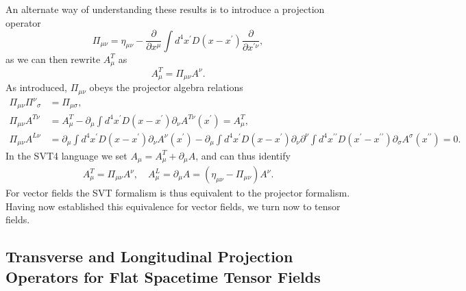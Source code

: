 \documentclass[aps,onecolumn,10pt]{revtex4}
\numberwithin{equation}{section}
\numberwithin{equation}{section}
\begin{document}
An alternate way of understanding these results is to introduce a projection operator
%
\begin{equation}
\Pi_{\mu\nu}=\eta_{\mu\nu}-\frac{\partial}{\partial x^{\mu}}\int
d^4x^{\prime}D(x-x^{\prime})\frac{\partial}{\partial x^{\prime \nu}},
\label{A.5a}
\end{equation}
%
as we can then rewrite $A_{\mu}^T$  as 
%
\begin{equation}
A_{\mu}^{T}=\Pi_{\mu\nu}A^{\nu}.
\label{A.6a}
\end{equation}
%
As introduced, $\Pi_{\mu\nu}$ obeys the projector algebra relations
%
\begin{align}
\Pi_{\mu\nu}\Pi^{\nu}_{\phantom{\sigma}\sigma}
&=\Pi_{\mu\sigma},
\nonumber \\
\Pi_{\mu\nu}A^{T \nu}&= A^{T}_{\mu}-\partial_{\mu}\int
d^4x^{\prime}D(x-x^{\prime})
\partial_{\nu}A^{T\nu}(x^{\prime})=A^{T}_{\mu},
\nonumber \\
\Pi_{\mu\nu}A^{L \nu}&=\partial_{\mu}\int
d^4x^{\prime}D(x-x^{\prime})\partial_{\nu}A^{\nu}(x^{\prime})
-\partial_{\mu}\int
d^4x^{\prime}D(x-x^{\prime})
\partial_{\nu}\partial^{\nu}\int
d^4x^{\prime\prime}D(x^{\prime}-x^{\prime\prime})
\partial_{\sigma}A^{\sigma}(x^{\prime\prime})=0.
\label{A.7a}
\end{align}
%
In the SVT4 language we set  $A_{\mu}=A_{\mu}^T+\partial_{\mu}A$, and can thus identify 
%
\begin{eqnarray}
A_{\mu}^T=  \Pi_{\mu\nu}A^{\nu},\quad A_{\mu}^L=\partial_{\mu}A=(\eta_{\mu\nu}-\Pi_{\mu\nu})A^{\nu}.
\label{A.8a}
\end{eqnarray}
%
For vector fields the SVT formalism is thus equivalent to the projector formalism.  Having now established this equivalence for vector fields, we turn now to tensor fields.

\subsection{Transverse and Longitudinal Projection Operators for Flat Spacetime Tensor Fields}
\end{document}
